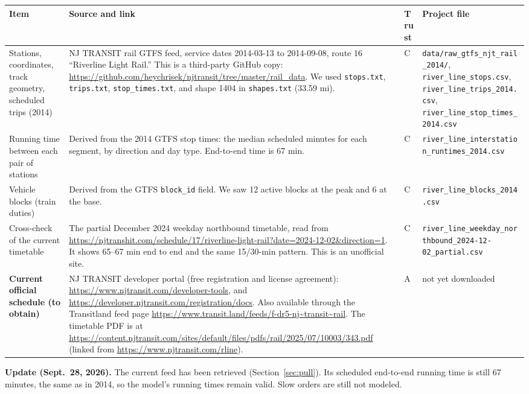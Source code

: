\documentclass[11pt]{article}
\begin{document}
\begin{longtable}{@{}p{3.3cm}p{7.8cm}p{1.0cm}p{2.6cm}@{}}
\toprule
Item & Source and link & Trust & Project file \\
\midrule
\endhead
Stations, coordinates, track geometry, scheduled trips (2014) &
NJ TRANSIT rail GTFS feed, service dates 2014-03-13 to 2014-09-08, route 16 ``Riverline Light Rail.'' This is a third-party GitHub copy: \url{https://github.com/heychrisek/njtransit/tree/master/rail_data}. We used \texttt{stops.txt}, \texttt{trips.txt}, \nolinkurl{stop_times.txt}, and shape 1404 in \texttt{shapes.txt} (33.59 mi). &
C & \nolinkurl{data/raw_gtfs_njt_rail_2014/}, \nolinkurl{river_line_stops.csv}, \nolinkurl{river_line_trips_2014.csv}, \nolinkurl{river_line_stop_times_2014.csv} \\
Running time between each pair of stations &
Derived from the 2014 GTFS stop times: the median scheduled minutes for each segment, by direction and day type. End-to-end time is 67 min. &
C & \nolinkurl{river_line_interstation_runtimes_2014.csv} \\
Vehicle blocks (train duties) &
Derived from the GTFS \nolinkurl{block_id} field. We saw 12 active blocks at the peak and 6 at the base. &
C & \nolinkurl{river_line_blocks_2014.csv} \\
Cross-check of the current timetable &
The partial December 2024 weekday northbound timetable, read from \url{https://njtranshit.com/schedule/17/riverline-light-rail?date=2024-12-02&direction=1}. It shows 65--67 min end to end and the same 15/30-min pattern. This is an unofficial site. &
C & \nolinkurl{river_line_weekday_northbound_2024-12-02_partial.csv} \\
\textbf{Current official schedule (to obtain)} &
NJ TRANSIT developer portal (free registration and license agreement): \url{https://www.njtransit.com/developer-tools}, and \url{https://developer.njtransit.com/registration/docs}. Also available through the Transitland feed page \url{https://www.transit.land/feeds/f-dr5-nj~transit~rail}. The timetable PDF is at \url{https://content.njtransit.com/sites/default/files/pdfs/rail/2025/07/10003/343.pdf} (linked from \url{https://www.njtransit.com/rline}). &
A & not yet downloaded \\
\bottomrule
\end{longtable}

\noindent\textbf{Update (Sept.~28, 2026).} The current feed has been retrieved (Section~\ref{sec:pull}). Its scheduled end-to-end running time is still 67 minutes, the same as in 2014, so the model's running times remain valid. Slow orders are still not modeled.
\end{document}

